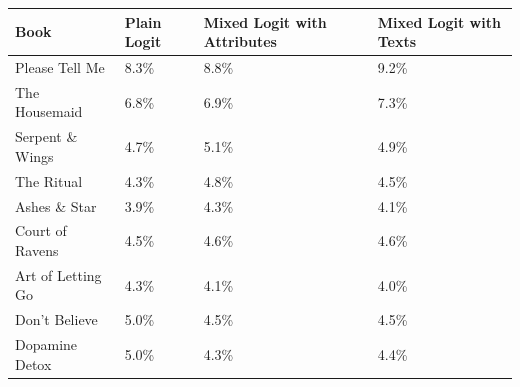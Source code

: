 \begin{centering}
\begin{tabular}{>{\raggedright}p{5cm}>{\raggedright}p{2cm}>{\centering}p{2cm}>{\centering}p{2cm}}
\hline
{\footnotesize\textbf{Book}} & {\footnotesize\textbf{Plain Logit}} & {\footnotesize\textbf{Mixed Logit with Attributes}} & {\footnotesize\textbf{Mixed Logit with Texts}}\tabularnewline
\hline
{\footnotesize Please Tell Me} & {\footnotesize 8.3\%} & {\footnotesize 8.8\%} & {\footnotesize 9.2\%}\tabularnewline
{\footnotesize The Housemaid} & {\footnotesize 6.8\%} & {\footnotesize 6.9\%} & {\footnotesize 7.3\%}\tabularnewline
{\footnotesize Serpent \& Wings} & {\footnotesize 4.7\%} & {\footnotesize 5.1\%} & {\footnotesize 4.9\%}\tabularnewline
{\footnotesize The Ritual} & {\footnotesize 4.3\%} & {\footnotesize 4.8\%} & {\footnotesize 4.5\%}\tabularnewline
{\footnotesize Ashes \& Star} & {\footnotesize 3.9\%} & {\footnotesize 4.3\%} & {\footnotesize 4.1\%}\tabularnewline
{\footnotesize Court of Ravens} & {\footnotesize 4.5\%} & {\footnotesize 4.6\%} & {\footnotesize 4.6\%}\tabularnewline
{\footnotesize Art of Letting Go} & {\footnotesize 4.3\%} & {\footnotesize 4.1\%} & {\footnotesize 4.0\%}\tabularnewline
{\footnotesize Don't Believe} & {\footnotesize 5.0\%} & {\footnotesize 4.5\%} & {\footnotesize 4.5\%}\tabularnewline
{\footnotesize Dopamine Detox} & {\footnotesize 5.0\%} & {\footnotesize 4.3\%} & {\footnotesize 4.4\%}\tabularnewline
\hline
\end{tabular}
\par\end{centering}